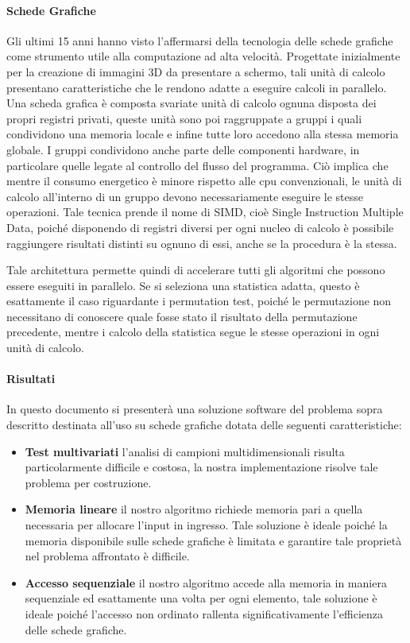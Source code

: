 \paragraph{Schede Grafiche}
Gli ultimi 15 anni hanno visto l'affermarsi della tecnologia delle schede grafiche come strumento utile alla computazione ad alta velocità.
Progettate inizialmente per la creazione di immagini 3D da presentare a schermo, tali unità di calcolo presentano caratteristiche che le rendono adatte a eseguire calcoli in parallelo.
Una scheda grafica è composta svariate unità di calcolo ognuna disposta dei propri registri privati, queste unità sono poi raggruppate a gruppi i quali condividono una memoria locale e infine tutte loro accedono alla stessa memoria globale. 
I gruppi condividono anche parte delle componenti hardware, in particolare quelle legate al controllo del flusso del programma. Ciò implica che mentre il consumo energetico è minore rispetto alle cpu convenzionali, le unità di calcolo all'interno di un gruppo devono necessariamente eseguire le stesse operazioni. Tale tecnica prende il nome di SIMD, cioè Single Instruction Multiple Data, poiché disponendo di registri diversi per ogni nucleo di calcolo è possibile raggiungere risultati distinti su ognuno di essi, anche se la procedura è la stessa.

Tale architettura permette quindi di accelerare tutti gli algoritmi che possono essere eseguiti in parallelo. Se si seleziona una statistica adatta, questo è esattamente il caso riguardante i permutation test, poiché le permutazione non necessitano di conoscere quale fosse stato il risultato della permutazione precedente, mentre i calcolo della statistica segue le stesse operazioni in ogni unità di calcolo.

\paragraph{Risultati}
In questo documento si presenterà una soluzione software del problema sopra descritto destinata all'uso su schede grafiche dotata delle seguenti caratteristiche:
\begin{itemize}
	\item \textbf{Test multivariati} l'analisi di campioni multidimensionali risulta particolarmente difficile e costosa, la nostra implementazione risolve tale problema per costruzione.
	\item \textbf{Memoria lineare} il nostro algoritmo richiede memoria pari a quella necessaria per allocare l'input in ingresso. Tale soluzione è ideale poiché la memoria disponibile sulle schede grafiche è limitata e garantire tale proprietà nel problema affrontato è difficile.
	\item \textbf{Accesso sequenziale} il nostro algoritmo accede alla memoria in maniera sequenziale ed esattamente una volta per ogni elemento, tale soluzione è ideale poiché l'accesso non ordinato rallenta significativamente l'efficienza delle schede grafiche.
\end{itemize}
